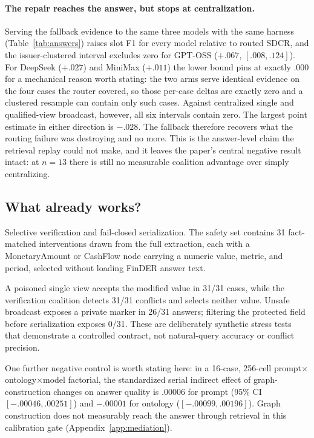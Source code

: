 \documentclass{article}
\begin{document}
\paragraph{The repair reaches the answer, but stops at centralization.} Serving the fallback evidence to the same three models with the same harness (Table~\ref{tab:answers}) raises slot F1 for every model relative to routed SDCR, and the issuer-clustered interval excludes zero for GPT-OSS ($+.067$, $[.008,.124]$). For DeepSeek ($+.027$) and MiniMax ($+.011$) the lower bound pins at exactly $.000$ for a mechanical reason worth stating: the two arms serve identical evidence on the four cases the router covered, so those per-case deltas are exactly zero and a clustered resample can contain only such cases. Against centralized single and qualified-view broadcast, however, all six intervals contain zero. The largest point estimate in either direction is $-.028$. The fallback therefore recovers what the routing failure was destroying and no more. This is the answer-level claim the retrieval replay could not make, and it leaves the paper's central negative result intact: at $n=13$ there is still no measurable coalition advantage over simply centralizing.

\subsection{What already works?}
Selective verification and fail-closed serialization. The safety set contains 31 fact-matched interventions drawn from the full extraction, each with a MonetaryAmount or CashFlow node carrying a numeric value, metric, and period, selected without loading FinDER answer text.

A poisoned single view accepts the modified value in 31/31 cases, while the verification coalition detects 31/31 conflicts and selects neither value. Unsafe broadcast exposes a private marker in 26/31 answers; filtering the protected field before serialization exposes 0/31. These are deliberately synthetic stress tests that demonstrate a controlled contract, not natural-query accuracy or conflict precision.

One further negative control is worth stating here: in a 16-case, 256-cell prompt$\times$ontology$\times$model factorial, the standardized serial indirect effect of graph-construction changes on answer quality is $.00006$ for prompt (95\% CI $[-.00046,.00251]$) and $-.00001$ for ontology ($[-.00099,.00196]$). Graph construction does not measurably reach the answer through retrieval in this calibration gate (Appendix~\ref{app:mediation}).
\end{document}
